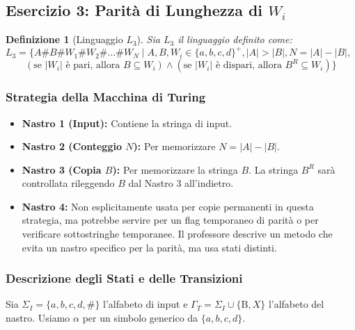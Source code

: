 \documentclass[a4paper]{article}
\newtheorem{definition}{Definizione}
\newcommand{\B}{\text{B}} %
\begin{document}
\subsection{Esercizio 3: Parità di Lunghezza di $W_i$}

\begin{definition}[Linguaggio $L_3$]
Sia $L_3$ il linguaggio definito come:
$L_3 = \{A\#B\#W_1 \# W_2 \# \dots \# W_N \mid A, B, W_i \in \{a,b,c,d\}^+, |A| > |B|, N = |A| - |B|, $
$\qquad (\text{se } |W_i| \text{ è pari, allora } B \subseteq W_i) \land (\text{se } |W_i| \text{ è dispari, allora } B^R \subseteq W_i) \}$
\end{definition}

\subsubsection{Strategia della Macchina di Turing}
\begin{itemize}
    \item \textbf{Nastro 1 (Input):} Contiene la stringa di input.
    \item \textbf{Nastro 2 (Conteggio $N$):} Per memorizzare $N = |A| - |B|$.
    \item \textbf{Nastro 3 (Copia $B$):} Per memorizzare la stringa $B$. La stringa $B^R$ sarà controllata rileggendo $B$ dal Nastro 3 all'indietro.
    \item \textbf{Nastro 4:} Non esplicitamente usata per copie permanenti in questa strategia, ma potrebbe servire per un flag temporaneo di parità o per verificare sottostringhe temporanee. Il professore descrive un metodo che evita un nastro specifico per la parità, ma usa stati distinti.
\end{itemize}

\subsubsection{Descrizione degli Stati e delle Transizioni}
Sia $\Sigma_I = \{a,b,c,d,\#\}$ l'alfabeto di input e $\Gamma_T = \Sigma_I \cup \{\B, X\}$ l'alfabeto del nastro. Usiamo $\alpha$ per un simbolo generico da $\{a,b,c,d\}$.
\end{document}
